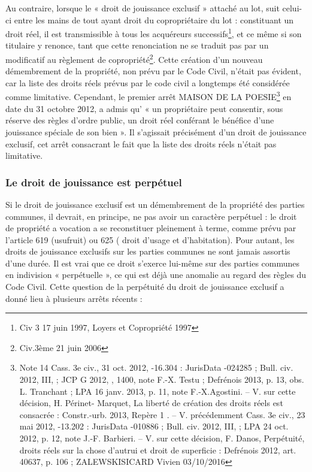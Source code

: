 			Au contraire, lorsque le « droit de jouissance exclusif » attaché au lot, suit celui-ci entre les mains de tout
			ayant droit du copropriétaire du lot : constituant un droit réel, il est transmissible à tous les acquéreurs
			successifs\footnote{Civ 3\degre{} 17 juin 1997, Loyers et Copropriété 1997 }, et ce même si son titulaire y renonce, tant que cette renonciation ne se traduit pas par un
			modificatif au règlement de copropriété\footnote{Civ.3ème 21 juin 2006}.
			Cette création d’un nouveau démembrement de la propriété, non prévu par le Code Civil, n’était pas
			évident, car la liste des droits réels prévus par le code civil a longtemps été considérée comme limitative.
			Cependant, le premier arrêt MAISON DE LA POESIE\footnote{Note 14 Cass. 3e civ., 31 oct. 2012, -16.304 : JurisData -024285 ; Bull. civ. 2012, III,  ; JCP G 2012, , 1400,
				note F.-X. Testu ; Defrénois 2013, p. 13, obs. L. Tranchant ; LPA 16 janv. 2013, p. 11, note F.-X.Agostini. – V. sur cette décision, H. Périnet-
				Marquet, La liberté de création des droits réels est consacrée : Constr.-urb. 2013, Repère 1 . – V. précédemment Cass. 3e civ., 23 mai
				2012, -13.202 : JurisData -010886 ; Bull. civ. 2012, III,  ; LPA 24 oct. 2012, p. 12, note J.-F. Barbieri. – V. sur cette
				décision, F. Danos, Perpétuité, droits réels sur la chose d'autrui et droit de superficie : Defrénois 2012, art. 40637, p. 106 ; ZALEWSKISICARD  Vivien 03/10/2016} en date du 31 octobre 2012, a admis qu’ « un
			propriétaire peut consentir, sous réserve des règles d'ordre public, un droit réel conférant le bénéfice d'une
			jouissance spéciale de son bien ». Il s’agissait précisément d’un droit de jouissance exclusif, cet arrêt
			consacrant le fait que la liste des droits réels n’était pas limitative.
		
		\subsubsection{Le droit de jouissance est perpétuel}
		
			Si le droit de jouissance exclusif est un démembrement de la propriété des parties communes, il devrait,
			en principe, ne pas avoir un caractère perpétuel : le droit de propriété a vocation a se reconstituer
			pleinement à terme, comme prévu par l’article 619 (usufruit) ou 625 ( droit d’usage et d’habitation).
			Pour autant, les droits de jouissance exclusifs sur les parties communes ne sont jamais assortis d’une
			durée. Il est vrai que ce droit s’exerce lui-même sur des parties communes en indivision « perpétuelle »,
			ce qui est déjà une anomalie au regard des règles du Code Civil. Cette question de la perpétuité du droit
			de jouissance exclusif a donné lieu à plusieurs arrêts récents :
			
